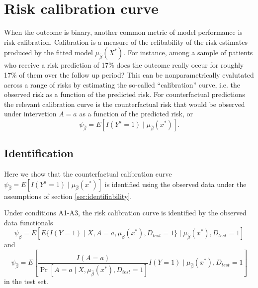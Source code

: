 \section{Risk calibration curve}\label{sec:calib}
When the outcome is binary, another common metric of model performance is risk calibration. Calibration is a measure of the relibability of the risk estimates produced by the fitted model $\mu_{\widehat{\beta}}(X^*)$. For instance, among a sample of patients who receive a risk prediction of 17\% does the outcome really occur for roughly 17\% of them over the follow up period? This can be nonparametrically evalutated across a range of risks by estimating the so-called ``calibration'' curve, i.e. the observed risk as a function of the predicted risk. For counterfactual predictions the relevant calibration curve is the counterfactual risk that would be observed under intervetion $A=a$ as a function of the predicted risk, or
\begin{equation}\label{eqn:calib_estimand}
    \psi_{\widehat{\beta}} = E[I(Y^a = 1) \mid \mu_{\widehat{\beta}}(x^*)].
\end{equation}

\subsection{Identification}
Here we show that the counterfactual calibration curve $\psi_{\widehat{\beta}} = E[I(Y^a = 1) \mid \mu_{\widehat{\beta}}(x^*)]$ is identified using the observed data under the assumptions of section \ref{sec:identifiability}.
\begin{theorem}
     Under conditions A1-A3, the risk calibration curve is identified by the observed data functionals
\begin{equation}\label{eqn:cl_calib_estimand}
    \psi_{\widehat{\beta}} = E[E\{I(Y = 1) \mid X, A = a, \mu_{\widehat{\beta}}(x^*), D_{test} = 1\}\mid \mu_{\widehat{\beta}}(x^*), D_{test} = 1]
\end{equation}
and 
\begin{equation}\label{eqn:ipw_calib_estimand}
    \psi_{\widehat{\beta}} = E\left[\frac{I(A = a)}{\Pr[A = a \mid X, \mu_{\widehat{\beta}}(x^*), D_{test} = 1]} I(Y=1) \mid \mu_{\widehat{\beta}}(x^*), D_{test} = 1\right]
\end{equation}
in the test set. 

\end{theorem}

